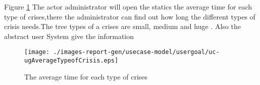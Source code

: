 \begin{usecase}

\end{usecase} 


Figure \ref{fig:lu.uni.lassy.excalibur.examples.icrash-RE-UCD-uc-ugAverageTypeofCrisis}
The actor administrator will open the statics the average time for each type of crises,there the administrator can find out how long the different types of crisis needs.The tree types of a crises are small, medium and huge . Also the abstract user System give the information  

\begin{figure}[htbp]
\begin{center}

\texttt{[image: ./images-report-gen/usecase-model/usergoal/uc-ugAverageTypeofCrisis.eps]}
\end{center}
\caption[lu.uni.lassy.excalibur.examples.icrash Use Case Diagram: uc-ugAverageTypeofCrisis]{The average time for each type of crises}
\label{fig:lu.uni.lassy.excalibur.examples.icrash-RE-UCD-uc-ugAverageTypeofCrisis}
\end{figure}
\vspace{0.5cm}
